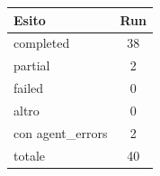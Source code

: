 \begin{tabularx}{\textwidth}{l S[table-format=3.0]}
  \toprule
  Esito & {Run} \\
  \midrule
  completed & 38 \\
  partial & 2 \\
  failed & 0 \\
  altro & 0 \\
  con agent\_errors & 2 \\
  totale & 40 \\
  \bottomrule
\end{tabularx}
